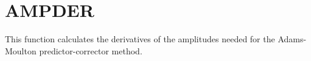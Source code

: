 \section{AMPDER}
\label{sect:ampder}

\noindent This function calculates the derivatives of the amplitudes needed
for the Adams-Moulton predictor-corrector method.\\

